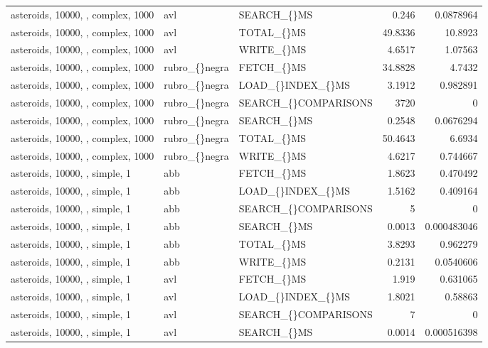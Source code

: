 \begin{longtable}{p{4cm}p{1.4cm}p{2.6cm}rr}
asteroids, 10000, , complex, 1000 & avl & SEARCH\_\allowbreak\{\}MS & 0.246 & 0.0878964\\
asteroids, 10000, , complex, 1000 & avl & TOTAL\_\allowbreak\{\}MS & 49.8336 & 10.8923\\
asteroids, 10000, , complex, 1000 & avl & WRITE\_\allowbreak\{\}MS & 4.6517 & 1.07563\\
asteroids, 10000, , complex, 1000 & rubro\_\allowbreak\{\}negra & FETCH\_\allowbreak\{\}MS & 34.8828 & 4.7432\\
asteroids, 10000, , complex, 1000 & rubro\_\allowbreak\{\}negra & LOAD\_\allowbreak\{\}INDEX\_\allowbreak\{\}MS & 3.1912 & 0.982891\\
asteroids, 10000, , complex, 1000 & rubro\_\allowbreak\{\}negra & SEARCH\_\allowbreak\{\}COMPARISONS & 3720 & 0\\
asteroids, 10000, , complex, 1000 & rubro\_\allowbreak\{\}negra & SEARCH\_\allowbreak\{\}MS & 0.2548 & 0.0676294\\
asteroids, 10000, , complex, 1000 & rubro\_\allowbreak\{\}negra & TOTAL\_\allowbreak\{\}MS & 50.4643 & 6.6934\\
asteroids, 10000, , complex, 1000 & rubro\_\allowbreak\{\}negra & WRITE\_\allowbreak\{\}MS & 4.6217 & 0.744667\\
asteroids, 10000, , simple, 1 & abb & FETCH\_\allowbreak\{\}MS & 1.8623 & 0.470492\\
asteroids, 10000, , simple, 1 & abb & LOAD\_\allowbreak\{\}INDEX\_\allowbreak\{\}MS & 1.5162 & 0.409164\\
asteroids, 10000, , simple, 1 & abb & SEARCH\_\allowbreak\{\}COMPARISONS & 5 & 0\\
asteroids, 10000, , simple, 1 & abb & SEARCH\_\allowbreak\{\}MS & 0.0013 & 0.000483046\\
asteroids, 10000, , simple, 1 & abb & TOTAL\_\allowbreak\{\}MS & 3.8293 & 0.962279\\
asteroids, 10000, , simple, 1 & abb & WRITE\_\allowbreak\{\}MS & 0.2131 & 0.0540606\\
asteroids, 10000, , simple, 1 & avl & FETCH\_\allowbreak\{\}MS & 1.919 & 0.631065\\
asteroids, 10000, , simple, 1 & avl & LOAD\_\allowbreak\{\}INDEX\_\allowbreak\{\}MS & 1.8021 & 0.58863\\
asteroids, 10000, , simple, 1 & avl & SEARCH\_\allowbreak\{\}COMPARISONS & 7 & 0\\
asteroids, 10000, , simple, 1 & avl & SEARCH\_\allowbreak\{\}MS & 0.0014 & 0.000516398\\

\end{longtable}
